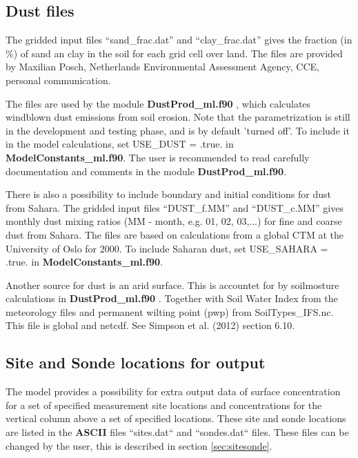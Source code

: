 \subsection{Dust files}

The gridded input files ``sand\_frac.dat'' and ``clay\_frac.dat'' gives the fraction (in \%)  
of sand an clay in the soil for each grid cell over land. The files are provided by 
Maxilian Posch, Netherlands Environmental Assessment Agency, CCE, personal communication.

The files are used by the module {\bf DustProd\_ml.f90 }, which calculates windblown dust 
emissions from soil erosion. Note that the parametrization is still in the development and 
testing phase, and is by default 'turned off'. To include it in the model calculations, set 
USE\_DUST = .true. in {\bf ModelConstants\_ml.f90}.
The user is recommended to read carefully documentation and
comments in the module {\bf DustProd\_ml.f90}.

There is also a possibility to include boundary and initial conditions for dust from Sahara. 
The gridded input files ``DUST\_f.MM'' and ``DUST\_c.MM'' gives monthly dust mixing 
ratios (MM - month, e.g. 01, 02, 03,...) for fine and coarse dust from Sahara. The files are based on calculations 
from a global CTM at the University of Oslo for 2000. 
To include Saharan dust, set USE\_SAHARA = .true. in {\bf ModelConstants\_ml.f90}.

Another source for dust is an arid surface. This is accountet for by soilmosture calculations in {\bf DustProd\_ml.f90 }. 
Together with Soil Water Index from the meteorology files and permanent wilting point (pwp) from SoilTypes\_IFS.nc. 
This file is global and netcdf. See Simpson et al. (2012) section 6.10.



\subsection{Site and Sonde locations for output}\label{sec:sitessondes_input}
The model provides a possibility for extra output data of surface concentration 
for a set of specified measurement site locations and concentrations for the vertical 
column above a set of specified locations. These site and sonde locations are listed 
in the {\bf ASCII} files ``sites.dat`` and ``sondes.dat`` files. These files can be 
changed by the user, this is described in section \ref{sec:sitesonde}.

